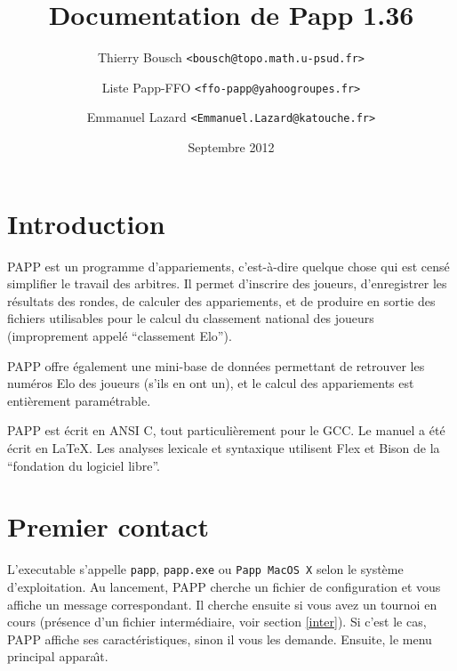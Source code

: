 \documentclass[10pt]{article}
\newif\iftth
\begin{document}
\title{\huge\bf Documentation de Papp 1.36}
\author{ {Thierry Bousch {\tt <bousch@topo.math.u-psud.fr>}}
\and {Liste Papp-FFO {\tt <ffo-papp@yahoogroupes.fr>}}
\and {Emmanuel Lazard {\tt <Emmanuel.Lazard@katouche.fr>}}
}
\date{Septembre 2012}
\maketitle

\iftth   
{\begin{html}<small>Si les math&#233;matiques de ce document sont
        bizarres, changez l'encodage (MacRoman ou ISO-8859-1) dans 
        votre navigateur. Et si le probl&#232;me persite, vous devriez 
        trouver une solution ici : http ://hutchinson.belmont.ma.us/tth/manual/ </small>
 \end{html}} 
\else {}
\fi    


\section{Introduction}

PAPP est un programme d'appariements, c'est-\`a-dire quelque chose qui 
est cens\'e simplifier le travail des arbitres.  Il permet d'inscrire 
des joueurs, d'enregistrer les r\'esultats des rondes, de calculer des 
appariements, et de produire en sortie des fichiers utilisables pour 
le calcul du classement national des joueurs (improprement appel\'e 
``classement Elo'').

PAPP offre \'egalement une mini-base de donn\'ees permettant de 
retrouver les num\'eros Elo des joueurs (s'ils en ont un), et le 
calcul des appariements est enti\`erement param\'etrable.

PAPP est \'ecrit en ANSI C, tout particuli\`erement pour le GCC. Le 
manuel a \'et\'e \'ecrit en \LaTeX. Les analyses lexicale et 
syntaxique utilisent Flex et Bison de la ``fondation du logiciel 
libre''.

\section{Premier contact}

	L'executable s'appelle \verb|papp|, \verb|papp.exe| ou \verb|Papp MacOS X| selon le
syst\`eme d'exploitation. Au lancement, PAPP cherche un fichier de configuration et vous affiche un message correspondant. Il cherche ensuite si vous avez un tournoi en cours (pr\'esence d'un fichier interm\'ediaire, voir section \ref{inter}). Si c'est le cas, PAPP affiche ses caract\'eristiques, sinon il vous les demande. Ensuite, le menu
principal appara{\^\i}t.
\end{document}
